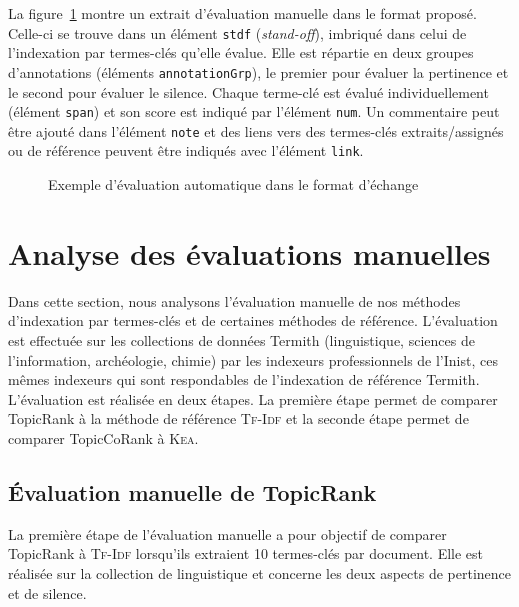         La figure~\ref{fig:tei_tbx_evaluation_example} montre un extrait
        d'évaluation manuelle dans le format proposé. Celle-ci se trouve dans un
        élément \texttt{stdf} (\textit{stand-off}), imbriqué dans celui de
        l'indexation par termes-clés qu'elle évalue. Elle est répartie en deux
        groupes d'annotations (éléments \texttt{annotationGrp}), le premier pour
        évaluer la pertinence et le second pour évaluer le silence. Chaque
        terme-clé est évalué individuellement (élément \texttt{span}) et son
        score est indiqué par l'élément \texttt{num}. Un commentaire peut être
        ajouté dans l'élément \texttt{note} et des liens vers des termes-clés
        extraits/assignés ou de référence peuvent être indiqués avec l'élément
        \texttt{link}.
        \begin{figure}[h!]
          \setlstxml
          
          \caption{Exemple d'évaluation automatique dans le format d'échange
                   \label{fig:tei_tbx_evaluation_example}}
        \end{figure}


  \section{Analyse des évaluations manuelles}
  \label{sec:main-automatic_evaluation_of_keyphrase_annotation-results}
    Dans cette section, nous analysons l'évaluation manuelle de nos méthodes
    d'indexation par termes-clés et de certaines méthodes de référence.
    L'évaluation est effectuée sur les collections de données Termith
    (linguistique, sciences de l'information, archéologie, chimie) par les
    indexeurs professionnels de l'Inist, ces mêmes indexeurs qui sont
    respondables de l'indexation de référence Termith. L'évaluation est réalisée
    en deux étapes. La première étape permet de comparer TopicRank à la méthode
    de référence \textsc{Tf-Idf} et la seconde étape permet de comparer
    TopicCoRank à \textsc{Kea}.
    
    \subsection{Évaluation manuelle de TopicRank}
    \label{subsec:main-automatic_evaluation_of_keyphrase_annotation-results-topicrank}
      La première étape de l'évaluation manuelle a pour objectif de comparer
      TopicRank à \textsc{Tf-Idf} lorsqu'ils extraient 10 termes-clés par
      document. Elle est réalisée sur la collection de linguistique et concerne
      les deux aspects de pertinence et de silence.
    
